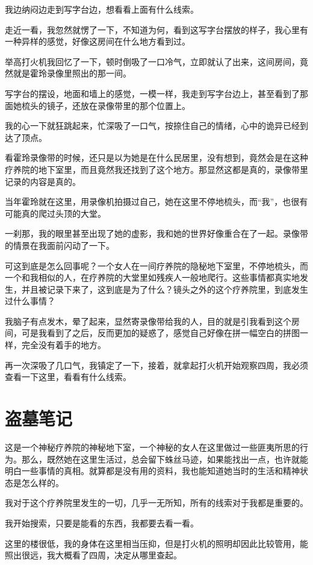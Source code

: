 我边纳闷边走到写字台边，想看看上面有什么线索。

走近一看，我忽然就愣了一下，不知道为何，看到这写字台摆放的样子，我心里有一种异样的感觉，好像这房间在什么地方看到过。

举高打火机我回忆了一下，顿时倒吸了一口冷气，立即就认了出来，这间房间，竟然就是霍玲录像里照出的那一间。

写字台的摆设，地面和墙上的感觉，一模一样，我走到写字台边上，甚至看到了那面她梳头的镜子，还放在录像带里的那个位置上。

我的心一下就狂跳起来，忙深吸了一口气，按捺住自己的情绪，心中的诡异已经到达了顶点。

看霍玲录像带的时候，还只是以为她是在什么民居里，没有想到，竟然会是在这种疗养院的地下室里，而且竟然我还找到了这个地方。那显然这都是真的，录像带里记录的内容是真的。

当年霍玲就在这里，用录像机拍摄过自己，她在这里不停地梳头，而“我”，也很有可能真的爬过头顶的大堂。

一刹那，我的眼里甚至出现了她的虚影，我和她的世界好像重合在了一起。录像带的情景在我面前闪动了一下。

可这到底是怎么回事呢？一个女人在一间疗养院的隐秘地下室里，不停地梳头，而一个和我相似的人，在疗养院的大堂里如残疾人一般地爬行。这些事情都真实地发生，并且被记录下来了，这到底是为了什么？镜头之外的这个疗养院里，到底发生过什么事情？

我脑子有点发木，晕了起来，显然寄录像带给我的人，目的就是引我看到这个房间，可是我看到了之后，反而更加的疑惑了，感觉自己好像在拼一幅空白的拼图一样，完全没有着手的地方。

再一次深吸了几口气，我镇定了一下，接着，就拿起打火机开始观察四周，我必须查看一下这里，看看有什么线索。

\chapter{盗墓笔记}

这是一个神秘疗养院的神秘地下室，一个神秘的女人在这里做过一些匪夷所思的行为。那么，既然她在这里生活过，总会留下蛛丝马迹，如果能找出一点，也许就能明白一些事情的真相。就算都是没有用的资料，我也能知道她当时的生活和精神状态是怎么样的。

我对于这个疗养院里发生的一切，几乎一无所知，所有的线索对于我都是重要的。

我开始搜索，只要是能看的东西，我都要去看一看。

这里的楼很低，我的身体在这里相当压抑，但是打火机的照明却因此比较管用，能照出很远，我大概看了四周，决定从哪里查起。

